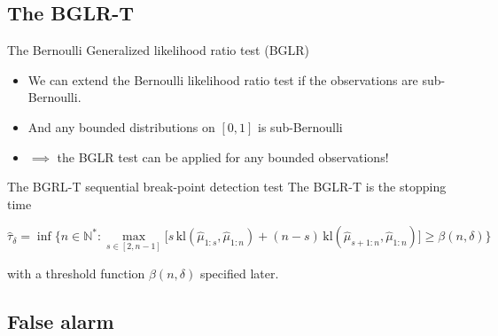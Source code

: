 \documentclass[11pt,english,ignorenonframetext,]{beamer}
\begin{document}
\subsection{\hfill{}The BGLR-T\hfill{}}

\begin{frame}{The Bernoulli Generalized likelihood ratio test (BGLR)}

  \begin{itemize}
    \item
    We can extend the Bernoulli likelihood ratio test if the observations are \alert{sub-Bernoulli}.
    \item
    And any bounded distributions on $[0,1]$ is sub-Bernoulli
    \item
    $\implies$ the BGLR test can be applied for any bounded observations!
  \end{itemize}


  \pause

  \begin{block}{The BGRL-T sequential break-point detection test}
    The \alert{BGLR-T} is the stopping time
    \begin{small}
    \[ \widehat{\tau}_{\delta} = \inf \bigl\{ n \in \mathbb{N}^* : \max_{s \in [2,n-1]} \bigl[s \, \mathrm{kl}\left(\widehat{\mu}_{1:s},\widehat{\mu}_{1:n}\right) + (n-s) \, \mathrm{kl}\left(\widehat{\mu}_{s+1:n},\widehat{\mu}_{1:n}\right)\bigr] \geq \beta(n,\delta) \bigr\} \]
    \end{small}
    with a \alert{threshold function} $\beta(n,\delta)$ specified later.
  \end{block}

\end{frame}


\subsection{\hfill{}False alarm\hfill{}}
\end{document}
